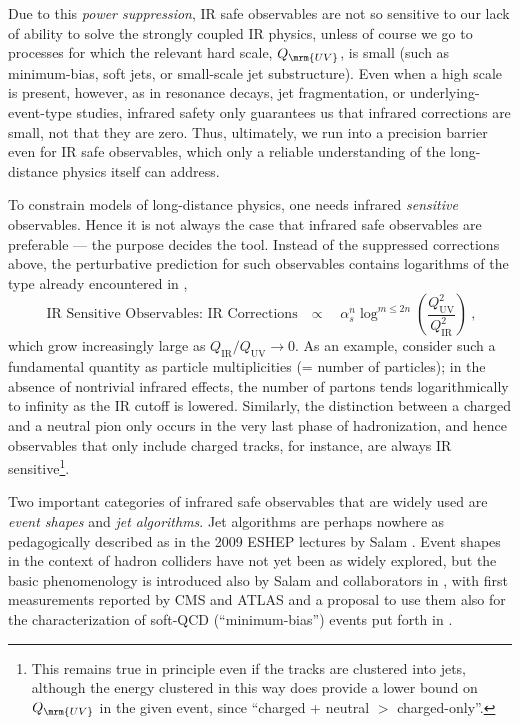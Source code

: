 Due to this \emph{power suppression}, 
IR safe observables are not so sensitive to our lack
of ability to solve the strongly coupled IR physics, unless of course
we go to processes for which the relevant hard scale, $Q_{\mrm{UV}}$, is small
(such as minimum-bias, soft jets, or small-scale jet substructure). 
Even when a high scale is present, however, as in resonance decays, jet
fragmentation, or underlying-event-type studies, infrared safety only
guarantees us that infrared corrections are small, not that they are zero. 
Thus, ultimately, we run into a precision barrier even for IR safe observables, 
which only a reliable understanding of the
long-distance physics itself can address. 

To constrain models of long-distance physics, one needs 
infrared \emph{sensitive} observables.
Hence it is not always the case that infrared safe
observables are preferable --- the purpose decides the tool.
Instead of the suppressed corrections above, the perturbative
prediction for such observables contains logarithms of the type
already encountered in ,
%
%
\begin{equation}
\mbox{IR Sensitive Observables: IR Corrections~~~$\propto$~~~} 
\alpha_s^n\log^{m\le
2n}\left(\frac{Q_{\mathrm{UV}}^2}{Q_{\mathrm{IR}}^2}\right)~,
\end{equation}
 which grow
increasingly large as $Q_{\mathrm{IR}}/Q_{\mathrm{UV}}\to 0$.   
As an example, consider such a fundamental quantity as particle 
multiplicities (= number of particles);
in the absence of nontrivial infrared
effects, the number of partons tends logarithmically to infinity 
as the IR cutoff is lowered. Similarly, the distinction between
a charged and a neutral pion only occurs in the very last phase of
hadronization, and hence observables that only include charged tracks,
for instance, are always IR sensitive\footnote{This remains true in principle 
even if the tracks are clustered into jets, although the energy
clustered in this way does provide a lower bound on $Q_{\mrm{UV}}$ in
the given event, since ``charged + neutral $>$ charged-only''.}.

%
Two important categories of infrared safe observables that are widely used are
\emph{event shapes} and \emph{jet algorithms}. Jet algorithms are
perhaps nowhere as pedagogically described as in the 2009 ESHEP lectures by 
Salam \cite[Chapter 5]{Salam:2010zt}. Event shapes in the context of
hadron colliders have not yet been as widely explored, but the basic
phenomenology is introduced also by Salam and collaborators in
\cite{Banfi:2010xy}, with first measurements reported by CMS and ATLAS 
\cite{Khachatryan:2011dx,Aad:2012} and a proposal to use them also for the
characterization of soft-QCD (``minimum-bias'') events put forth
in \cite{Wraight:2011ej}. 

